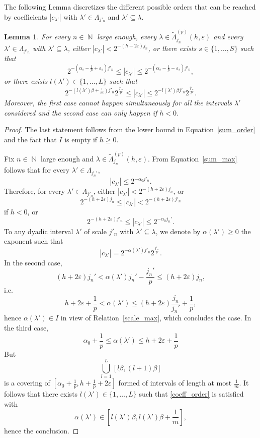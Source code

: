\documentclass[a4paper,11pt,oneside]{article}
\DeclareMathOperator{\N}{\mathbb{N}}
\newcommand{\ccint}[1]{\left[{#1}\right]}
\newcommand{\modu}[1]{\left\vert{#1}\right\vert}
\theoremstyle{definition}
\theoremstyle{plain}
\newtheorem{lemma}[defi]{Lemma}
\begin{document}
The following Lemma discretizes the different possible orders that can be reached by coefficients $\modu{c_{\lambda'}}$ with $\lambda'\in\Lambda_{j'_n}$ and $\lambda'\subseteq\lambda$.

\begin{lemma}\label{lm:list_orders}
For every $n\in\N$ large enough, every $\lambda\in\widetilde{\Lambda}_{j_n}^{(p)}(h,\varepsilon)$ and every $\lambda'\in\Lambda_{j'_n}$ with $\lambda'\subseteq\lambda$, either $\modu{c_{\lambda'}}<2^{-(h+2\varepsilon)j_n}$, or there exists $s\in\{1,\ldots,S\}$ such that
\[
2^{-\left(\alpha_s-\frac{1}{p}+\varepsilon_s\right)j'_n} \leq \modu{c_{\lambda'}} \leq 2^{-\left(\alpha_s-\frac{1}{p}-\varepsilon_s\right)j'_n}, 
\]
or there exists $l(\lambda')\in\{1,\ldots,L\}$ such that
\[
2^{-\left(l(\lambda')\beta+\frac{1}{m}\right)j'_n}2^{\frac{j'_n}{p}}\leq\modu{c_{\lambda'}}\leq 2^{-l(\lambda')\beta j'_n}2^{\frac{j'_n}{p}}.
\]
Moreover, the first case cannot happen simultaneously for all the intervals $\lambda'$ considered and the second case can only happen if $h<0$.
\end{lemma}

\begin{proof}
    The last statement follows from the lower bound in Equation~\eqref{sum_order} and the fact that $I$ is empty if $h\geq 0$.

    Fix $n\in\N$ large enough and $\lambda\in\widetilde{\Lambda}_{j_n}^{(p)}(h,\varepsilon)$. From Equation~\eqref{sum_max} follows that for every $\lambda'\in\Lambda_{j_n'}$,
    \[
    \modu{c_{\lambda'}} \leq 2^{-\alpha_0j'_n}.
    \]
    Therefore, for every $\lambda'\in\Lambda_{j'_n}$, either $\modu{c_{\lambda'}}< 2^{-(h+2\varepsilon)j_n}$, or
    \[
    2^{-(h+2\varepsilon)j_n} \leq \modu{c_{\lambda'}} < 2^{-(h+2\varepsilon)j'_n}
    \]
    if $h<0$, or
    \[
    2^{-(h+2\varepsilon)j'_n} \leq \modu{c_{\lambda'}} \leq 2^{-\alpha_0j_n'}.
    \]
    To any dyadic interval $\lambda'$ of scale $j'_n$ with $\lambda'\subseteq\lambda$, we denote by $\alpha(\lambda')\geq 0$ the exponent such that
    \begin{equation}\label{coeff_order}
    \modu{c_{\lambda'}}=2^{-\alpha(\lambda') j'_n}2^{\frac{j'_n}{p}}.
    \end{equation}
    In the second case, 
    \[
    (h+2\varepsilon)j_n' < \alpha(\lambda')j_n'-\frac{j_n'}{p} \leq (h+2\varepsilon)j_n,
    \]
    i.e.
    \[
    h+2\varepsilon+\frac{1}{p} < \alpha(\lambda') \leq (h+2\varepsilon)\frac{j_n}{j_n'}+\frac{1}{p},
    \]
    hence $\alpha(\lambda')\in I$ in view of Relation~\eqref{scale_max}, which concludes the case. In the third case,
    \[
    \alpha_0+\frac{1}{p} \leq \alpha(\lambda') \leq h+2\varepsilon+\frac{1}{p}
    \]
    But
    \[
    \bigcup_{l=1}^L\ccint{l\beta,(l+1)\beta}
    \]
    is a covering of $\ccint{\alpha_0+\frac{1}{p},h+\frac{1}{p}+2\varepsilon}$ formed of intervals of length at most $\frac{1}{m}$. It follows that there exists $l(\lambda')\in\{1,\ldots,L\}$ such that \eqref{coeff_order} is satisfied with 
    \[
    \alpha(\lambda')\in
    \ccint{l(\lambda')\beta,l(\lambda')\beta+\frac{1}{m}},
    \]
    hence the conclusion.
\end{proof}
\end{document}
